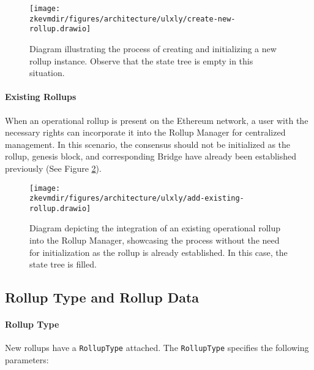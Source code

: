 \vspace{1em}

\begin{figure}[h]
\centering
\texttt{[image: \\zkevmdir/figures/architecture/ulxly/create-new-rollup.drawio]}
\caption{Diagram illustrating the process of creating and initializing a new rollup instance. Observe that the state tree is empty in this situation. }
\label{fig:create-new-rollup}
\end{figure}



\paragraph*{Existing Rollups}

When an operational rollup is present on the Ethereum network, a user with the necessary rights can incorporate it into the Rollup Manager for centralized management. In this scenario, the consensus should not be initialized as the rollup, genesis block, and corresponding Bridge have already been established previously (See Figure \ref{fig:add-existing-rollup}).

\begin{figure}[h]
\centering
\texttt{[image: \\zkevmdir/figures/architecture/ulxly/add-existing-rollup.drawio]}
\caption{Diagram depicting the integration of an existing operational rollup into the Rollup Manager, showcasing the process without the need for initialization as the rollup is already established. In this case, the state tree is filled. }
\label{fig:add-existing-rollup}
\end{figure}



\subsection{Rollup Type and Rollup Data}

\paragraph*{Rollup Type}

New rollups have a \texttt{RollupType} attached. The  \texttt{RollupType} specifies the following parameters:

